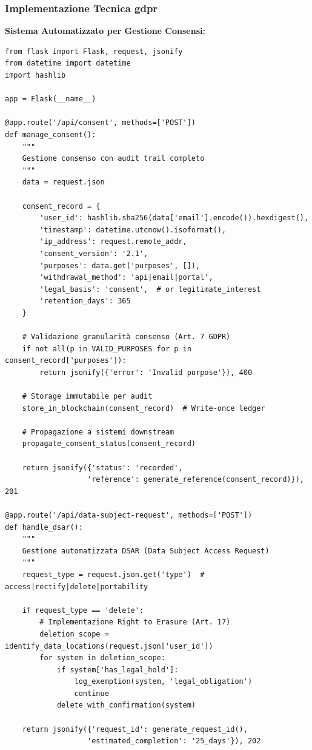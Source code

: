 \subsubsection{\texorpdfstring{Implementazione Tecnica \gls{gdpr}}{4.2.2.1 - Implementazione Tecnica GDPR}}

\textbf{Sistema Automatizzato per Gestione Consensi:}
\begin{lstlisting}[caption={API REST per Gestione Consensi \gls{gdpr}},label={lst:gdpr_consent}]
from flask import Flask, request, jsonify
from datetime import datetime
import hashlib

app = Flask(__name__)

@app.route('/api/consent', methods=['POST'])
def manage_consent():
    """
    Gestione consenso con audit trail completo
    """
    data = request.json
    
    consent_record = {
        'user_id': hashlib.sha256(data['email'].encode()).hexdigest(),
        'timestamp': datetime.utcnow().isoformat(),
        'ip_address': request.remote_addr,
        'consent_version': '2.1',
        'purposes': data.get('purposes', []),
        'withdrawal_method': 'api|email|portal',
        'legal_basis': 'consent',  # or legitimate_interest
        'retention_days': 365
    }
    
    # Validazione granularità consenso (Art. 7 GDPR)
    if not all(p in VALID_PURPOSES for p in consent_record['purposes']):
        return jsonify({'error': 'Invalid purpose'}), 400
    
    # Storage immutabile per audit
    store_in_blockchain(consent_record)  # Write-once ledger
    
    # Propagazione a sistemi downstream
    propagate_consent_status(consent_record)
    
    return jsonify({'status': 'recorded', 
                   'reference': generate_reference(consent_record)}), 201

@app.route('/api/data-subject-request', methods=['POST'])
def handle_dsar():
    """
    Gestione automatizzata DSAR (Data Subject Access Request)
    """
    request_type = request.json.get('type')  # access|rectify|delete|portability
    
    if request_type == 'delete':
        # Implementazione Right to Erasure (Art. 17)
        deletion_scope = identify_data_locations(request.json['user_id'])
        for system in deletion_scope:
            if system['has_legal_hold']:
                log_exemption(system, 'legal_obligation')
                continue
            delete_with_confirmation(system)
    
    return jsonify({'request_id': generate_request_id(),
                   'estimated_completion': '25_days'}), 202
\end{lstlisting}

